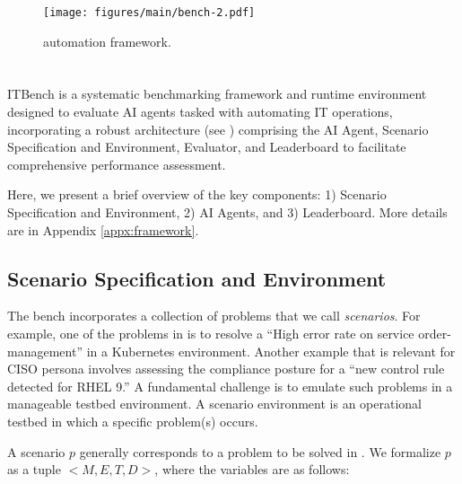 \begin{figure*}
    \centering    
    \texttt{[image: figures/main/bench-2.pdf]}
    \vspace{-8pt}
    \caption{\bench automation framework.}
\label{fig:bench_design1}
\vspace{-10pt}
\end{figure*}


\section{\bench}
\label{sec:bench}


ITBench is a systematic benchmarking framework and runtime environment designed to evaluate AI agents tasked with automating IT operations, incorporating a robust architecture (see ) comprising the AI Agent, Scenario Specification and Environment, Evaluator, and Leaderboard to facilitate comprehensive performance assessment.

Here, we present a brief overview of the key components: 1) Scenario Specification and Environment, 2) AI Agents, and 3) Leaderboard. More details are in Appendix \ref{appx:framework}.


\subsection{Scenario Specification and Environment}
\label{sec:scenarioenv}

The bench incorporates a collection of problems that we call \textit{scenarios}. For example, one of the problems in \bench is to resolve a ``High error rate on service order-management'' in a Kubernetes environment. Another example that is relevant for CISO persona involves assessing the compliance posture for a ``new control rule detected for RHEL 9.'' A fundamental challenge is to emulate such problems in a manageable testbed environment. A scenario environment is an operational testbed in which a specific problem(s) occurs. 

A scenario $p$ generally corresponds to a problem to be solved in \bench. We formalize $p$ as a tuple $<M, E, T, D>$, where the variables are as follows:

